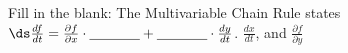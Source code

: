 {Fill in the blank: The Multivariable Chain Rule states \\[5pt]
$\ds\frac{df}{dt}=\frac{\partial f}{\partial x}\cdot\text{\underline{\hskip.5in}}+\text{\underline{\hskip.5in}}\cdot\frac{dy}{dt}$.
}
{$\frac{dx}{dt}$, and $\frac{\partial f}{\partial y}$}
